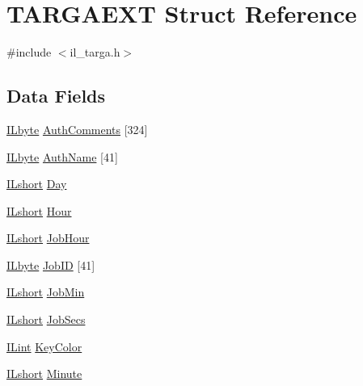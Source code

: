 \hypertarget{struct_t_a_r_g_a_e_x_t}{\section{T\-A\-R\-G\-A\-E\-X\-T Struct Reference}
\label{struct_t_a_r_g_a_e_x_t}
}


{\ttfamily \#include $<$il\-\_\-targa.\-h$>$}

\subsection*{Data Fields}
\begin{DoxyCompactItemize}
\item 
\hyperlink{il_8h_a88e562dacd22f4efcf6f9d31b85d4f92}{I\-Lbyte} \hyperlink{struct_t_a_r_g_a_e_x_t_af5d7ce2ec69d462bc82f2efa54be6e2a}{Auth\-Comments} \mbox{[}324\mbox{]}
\item 
\hyperlink{il_8h_a88e562dacd22f4efcf6f9d31b85d4f92}{I\-Lbyte} \hyperlink{struct_t_a_r_g_a_e_x_t_a411f2d8fd245db9a3d769ff487a1f049}{Auth\-Name} \mbox{[}41\mbox{]}
\item 
\hyperlink{il_8h_afc75ded918970afe7517d3f7f0561db3}{I\-Lshort} \hyperlink{struct_t_a_r_g_a_e_x_t_aa2f710c759a27dd23bc471db64d8c189}{Day}
\item 
\hyperlink{il_8h_afc75ded918970afe7517d3f7f0561db3}{I\-Lshort} \hyperlink{struct_t_a_r_g_a_e_x_t_a27f3f10ea4675ae5ff919cde9f9f028a}{Hour}
\item 
\hyperlink{il_8h_afc75ded918970afe7517d3f7f0561db3}{I\-Lshort} \hyperlink{struct_t_a_r_g_a_e_x_t_a538784a24cf1bd59833941285ad9dc9f}{Job\-Hour}
\item 
\hyperlink{il_8h_a88e562dacd22f4efcf6f9d31b85d4f92}{I\-Lbyte} \hyperlink{struct_t_a_r_g_a_e_x_t_a58ea2c012f35a07ddb51fb653487432e}{Job\-I\-D} \mbox{[}41\mbox{]}
\item 
\hyperlink{il_8h_afc75ded918970afe7517d3f7f0561db3}{I\-Lshort} \hyperlink{struct_t_a_r_g_a_e_x_t_a7d94a8ddaf2904b2536a183690f83a69}{Job\-Min}
\item 
\hyperlink{il_8h_afc75ded918970afe7517d3f7f0561db3}{I\-Lshort} \hyperlink{struct_t_a_r_g_a_e_x_t_a2eb95176156f42b49726009511b1f636}{Job\-Secs}
\item 
\hyperlink{il_8h_a288a97fb9e92e707a60b749d0039fafe}{I\-Lint} \hyperlink{struct_t_a_r_g_a_e_x_t_adb4cefeb26e7a48cc022efe51ca1f919}{Key\-Color}
\item 
\hyperlink{il_8h_afc75ded918970afe7517d3f7f0561db3}{I\-Lshort} \hyperlink{struct_t_a_r_g_a_e_x_t_a9efced16ca4e178314e9db1cf7730a7b}{Minute}

\end{DoxyCompactItemize}
